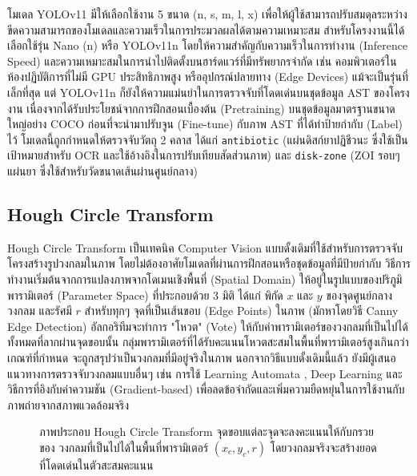 โมเดล YOLOv11 มีให้เลือกใช้งาน 5 ขนาด (n, s, m, l, x) เพื่อให้ผู้ใช้สามารถปรับสมดุลระหว่างขีดความสามารถของโมเดลและความเร็วในการประมวลผลได้ตามความเหมาะสม สำหรับโครงงานนี้ได้เลือกใช้รุ่น Nano (n) หรือ YOLOv11n โดยให้ความสำคัญกับความเร็วในการทำงาน (Inference Speed) และความเหมาะสมในการนำไปติดตั้งบนฮาร์ดแวร์ที่มีทรัพยากรจำกัด เช่น คอมพิวเตอร์ในห้องปฏิบัติการที่ไม่มี GPU ประสิทธิภาพสูง หรืออุปกรณ์ปลายทาง (Edge Devices) แม้จะเป็นรุ่นที่เล็กที่สุด แต่ YOLOv11n ก็ยังให้ความแม่นยำในการตรวจจับที่โดดเด่นบนชุดข้อมูล AST ของโครงงาน เนื่องจากได้รับประโยชน์จากการฝึกสอนเบื้องต้น (Pretraining) บนชุดข้อมูลมาตรฐานขนาดใหญ่อย่าง COCO ก่อนที่จะนำมาปรับจูน (Fine-tune) กับภาพ AST ที่ได้ทำป้ายกำกับ (Label) ไว้ โมเดลนี้ถูกกำหนดให้ตรวจจับวัตถุ 2 คลาส ได้แก่ \texttt{antibiotic} (แผ่นดิสก์ยาปฏิชีวนะ ซึ่งใช้เป็นเป้าหมายสำหรับ OCR และใช้อ้างอิงในการปรับเทียบสัดส่วนภาพ) และ \texttt{disk-zone} (ZOI รอบๆ แผ่นยา ซึ่งใช้สำหรับวัดขนาดเส้นผ่านศูนย์กลาง)

\subsection{Hough Circle Transform}

Hough Circle Transform เป็นเทคนิค Computer Vision แบบดั้งเดิมที่ใช้สำหรับการตรวจจับโครงสร้างรูปวงกลมในภาพ โดยไม่ต้องอาศัยโมเดลที่ผ่านการฝึกสอนหรือชุดข้อมูลที่มีป้ายกำกับ วิธีการทำงานเริ่มต้นจากการแปลงภาพจากโดเมนเชิงพื้นที่ (Spatial Domain) ให้อยู่ในรูปแบบของปริภูมิพารามิเตอร์ (Parameter Space) ที่ประกอบด้วย 3 มิติ ได้แก่ พิกัด $x$ และ $y$ ของจุดศูนย์กลางวงกลม และรัศมี $r$ สำหรับทุกๆ จุดที่เป็นเส้นขอบ (Edge Points) ในภาพ (มักหาโดยวิธี Canny Edge Detection) อัลกอริทึมจะทำการ "โหวต" (Vote) ให้กับค่าพารามิเตอร์ของวงกลมที่เป็นไปได้ทั้งหมดที่ลากผ่านจุดขอบนั้น กลุ่มพารามิเตอร์ที่ได้รับคะแนนโหวตสะสมในพื้นที่พารามิเตอร์สูงเกินกว่าเกณฑ์ที่กำหนด จะถูกสรุปว่าเป็นวงกลมที่มีอยู่จริงในภาพ นอกจากวิธีแบบดั้งเดิมนี้แล้ว ยังมีผู้เสนอแนวทางการตรวจจับวงกลมแบบอื่นๆ เช่น การใช้ Learning Automata \cite{cuevas2014}, Deep Learning \cite{ercan2020} และวิธีการที่อิงกับค่าความชัน (Gradient-based) \cite{shehata2015hough} เพื่อลดข้อจำกัดและเพิ่มความยืดหยุ่นในการใช้งานกับภาพถ่ายจากสภาพแวดล้อมจริง

\begin{figure}[H]
  \centering
  \caption{ภาพประกอบ Hough Circle Transform จุดขอบแต่ละจุดจะลงคะแนนให้กับกรวยของ
    วงกลมที่เป็นไปได้ในพื้นที่พารามิเตอร์ $(x_c, y_c, r)$
    โดยวงกลมจริงจะสร้างยอดที่โดดเด่นในตัวสะสมคะแนน \cite{shehata2015hough}}
  \label{fig:hough}
\end{figure}

